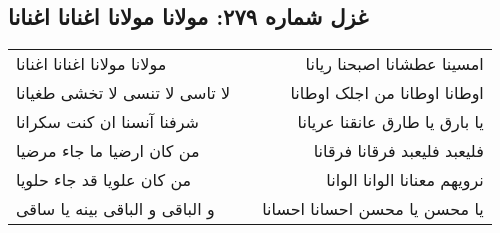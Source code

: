 \begin{center}
\section*{غزل شماره ۲۷۹: مولانا مولانا اغنانا اغنانا}
\label{sec:0279}
\begin{longtable}{l p{0.5cm} r}
مولانا مولانا اغنانا اغنانا
&&
امسینا عطشانا اصبحنا ریانا
\\
لا تاسی لا تنسی لا تخشی طغیانا
&&
اوطانا اوطانا من اجلک اوطانا
\\
شرفنا آنسنا ان کنت سکرانا
&&
یا بارق یا طارق عانقنا عریانا
\\
من کان ارضیا ما جاء مرضیا
&&
فلیعبد فلیعبد فرقانا فرقانا
\\
من کان علویا قد جاء حلویا
&&
نرویهم معنانا الوانا الوانا
\\
و الباقی و الباقی بینه یا ساقی
&&
یا محسن یا محسن احسانا احسانا
\\
\end{longtable}
\end{center}
